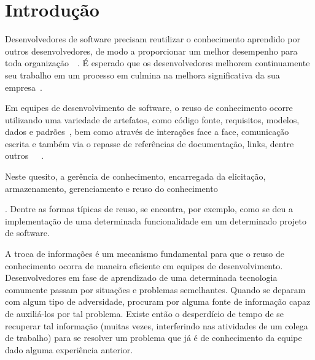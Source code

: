 \chapter{Introdução}

Desenvolvedores de software precisam reutilizar o conhecimento aprendido por outros desenvolvedores, de modo a proporcionar um melhor desempenho para toda organização~\cite{Druker1993}~\cite{Wiig2003}.
É esperado que os desenvolvedores melhorem continuamente seu trabalho em um processo em culmina na melhora significativa da sua empresa~\cite{Kavitha2011}.

Em equipes de desenvolvimento de software, o reuso de conhecimento ocorre utilizando uma variedade de artefatos, como código fonte, requisitos, modelos, dados e padrões~\cite{Levy2009}, bem como através de interações face a face, comunicação escrita e também via o repasse de referências de documentação, links, dentre outros~\cite{Storey2014}~\cite{Olson2000}~\cite{CubraniC2004}.

Neste quesito, a gerência de conhecimento, encarregada da elicitação, armazenamento, gerenciamento e reuso do conhecimento .
Dentre as formas típicas de reuso, se encontra, por exemplo, como se deu a implementação de uma determinada funcionalidade em um determinado projeto de software.




A troca de informações é um mecanismo fundamental para que o reuso de conhecimento ocorra de maneira eficiente em equipes de desenvolvimento. Desenvolvedores em fase de aprendizado de uma determinada tecnologia comumente passam por situações e problemas semelhantes. Quando se deparam com algum tipo de adversidade, procuram por alguma fonte de informação capaz de auxiliá-los por tal problema. Existe então o desperdício de tempo de se recuperar tal informação (muitas vezes, interferindo nas atividades de um colega de trabalho) para se resolver um problema que já é de conhecimento da equipe dado alguma experiência anterior.


